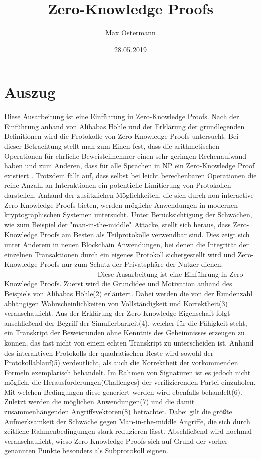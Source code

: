 \documentclass {article}
\title{Zero-Knowledge Proofs}
\author{Max Ostermann}
\date{28.05.2019}
\begin{document}
\maketitle
{}
\newpage
{}

\section{Auszug}


Diese Ausarbeitung ist eine Einf\"uhrung in Zero-Knowledge Proofs.
Nach der Einf\"uhrung anhand von Alibabas H\"ohle und der Erkl\"arung der grundlegenden Definitionen wird die Protokolle von Zero-Knowledge Proofs untersucht.
Bei dieser Betrachtung stellt man zum Einen fest, dass die arithmetischen Operationen für ehrliche Beweisteilnehmer einen sehr geringen Rechenaufwand haben und zum Anderen, dass f\"ur alle Sprachen in NP ein Zero-Knowledge Proof existiert \cite{GO94}. Trotzdem f\"allt auf, dass selbst bei leicht berechenbaren Operationen die reine Anzahl an Interaktionen ein potentielle Limitierung von Protokollen darstellen.
Anhand der zus\"atzlichen M\"oglichkeiten, die sich durch non-interactive Zero-Knowledge Proofs bieten, werden m\"ogliche Anwendungen in modernen kryptographischen Systemen untersucht. Unter Ber\"ucksichtigung der Schw\"achen, wie zum Beispiel der "man-in-the-middle" Attacke, stellt sich heraus, dass Zero-Knowledge Proofs am Besten als Teilprotokolle verwendbar sind. Dies zeigt sich unter Anderem in neuen Blockchain Anwendungen, bei denen die Integrität der einzelnen Transaktionen durch ein eigenes Protokoll sichergestellt wird und Zero-Knowledge Proofs nur zum Schutz der Privatsph\"are der Nutzer dienen.
\\


---------------------------------------
Diese Ausarbeitung ist eine Einführung in Zero-Knowledge Proofs.
Zuerst wird die Grundidee und Motivation anhand des Beispiels von Alibabas H\"ohle(2) erl\"autert. Dabei werden die von der Rundenzahl abh\"angigen Wahrscheinlichkeiten von Vollst\"andigkeit und Korrektheit(3) veranschaulicht. Aus der Erklärung der Zero-Knowledge Eigenschaft folgt anschließend der Begriff der Simulierbarkeit(4), welcher für die F\"ahigkeit steht, ein Transkript der Beweisrunden ohne Kenntnis des Geheimnisses erzeugen zu können, das fast nicht von einem echten Transkript zu unterscheiden ist. Anhand des interaktiven Protokolls der quadratischen Reste wird sowohl der Protokollablauf(5) verdeutlicht, als auch die Korrektheit der vorkommenden Formeln exemplarisch behandelt. Im Rahmen von Signaturen ist es jedoch nicht m\"oglich, die Herausforderungen(Challenges) der verifizierenden Partei einzuholen. Mit welchen Bedingungen diese generiert werden wird ebenfalls behandelt(6). 
Zuletzt werden die m\"oglichen Anwendungen(7) und die damit zusammenh\"angenden Angriffsvektoren(8) betrachtet. Dabei gilt die gr\"oßte Aufmerksamkeit der Schw\"ache gegen Man-in-the-middle Angriffe, die sich durch zeitliche Rahmenbedingungen stark reduzieren l\"asst. Abschlie\ss{}end wird nochmal veranschaulicht, wieso Zero-Knowledge Proofs sich auf Grund der vorher genannten Punkte besonders als Subprotokoll eignen.
\end{document}
